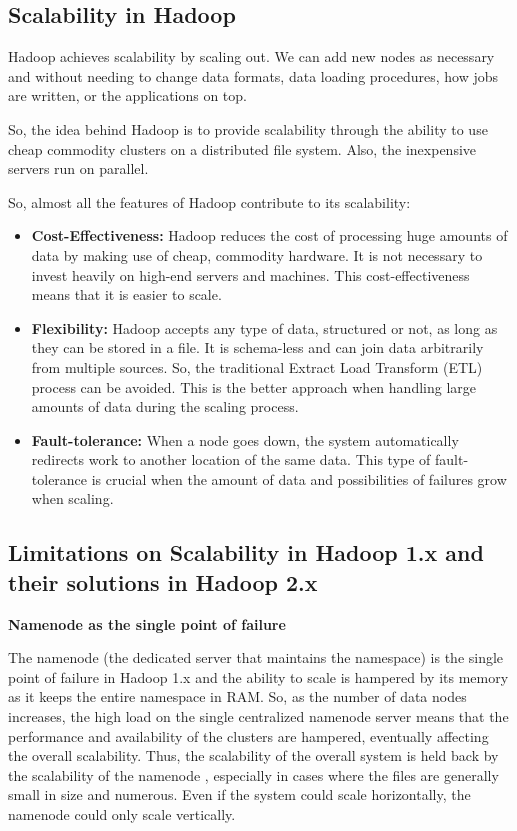 \documentclass[conference]{IEEEtran}
\begin{document}
\subsection{Scalability in Hadoop}

Hadoop achieves scalability by scaling out. We can add new nodes as necessary and without needing to change data formats, data loading procedures, how jobs are written, or the applications on top.

So, the idea behind Hadoop is to provide scalability through the ability to use cheap commodity clusters on a distributed file system. 
Also, the inexpensive servers run on parallel. 

So, almost all the features of Hadoop contribute to its scalability:

\begin{itemize}

    \item \textbf{Cost-Effectiveness:} Hadoop reduces the cost of processing huge amounts of data by making use of cheap, commodity hardware. 
            It is not necessary to invest heavily on high-end servers and machines. 
            This cost-effectiveness means that it is easier to scale.

    \item \textbf{Flexibility:} Hadoop accepts any type of data, structured or not, as long as they can be stored in a file. 
            It is schema-less and can join data arbitrarily from multiple sources. 
            So, the traditional Extract Load Transform (ETL) process can be avoided. 
            This is the better approach when handling large amounts of data during the scaling process.

   \item \textbf{Fault-tolerance:} When a node goes down, the system automatically redirects work to another location of the same data. 
       This type of fault-tolerance is crucial when the amount of data and possibilities of failures grow when scaling.

\end{itemize}

\subsection{Limitations on Scalability in Hadoop 1.x and their solutions in Hadoop 2.x}

\textbf{Namenode as the single point of failure}

The namenode (the dedicated server that maintains the namespace) is the single point of failure in Hadoop 1.x 
and the ability to scale is hampered by its memory as it keeps the entire namespace in RAM. 
So, as the number of data nodes increases, the high load on the single centralized namenode server means 
that the performance and availability of the clusters are hampered, eventually affecting the overall scalability. 
Thus, the scalability of the overall system is held back by the scalability of the namenode \cite{Shvachko2010}, especially in 
cases where the files are generally small in size and numerous. Even if the system could scale horizontally, the 
namenode could only scale vertically. 
\end{document}
